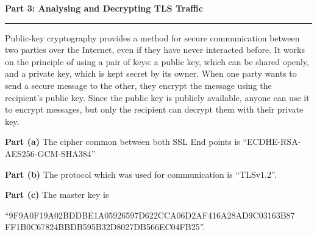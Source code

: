\documentclass[a4paper,12pt]{article}
\newenvironment{solution}[2][]{%
    \begin{mdframed}[linecolor=blue!70!black, linewidth=2pt, roundcorner=10pt, backgroundcolor=yellow!10!white, skipabove=12pt, skipbelow=12pt]%
        \textbf{\large #2}
        \par\noindent\rule{\textwidth}{0.4pt}
}{
    \end{mdframed}
}
\begin{document}
\begin{solution}{Part 3: Analysing and Decrypting TLS Traffic}
    Public-key cryptography provides a method for secure communication between two parties over the Internet, even if they have never interacted before. It works on the principle of using a pair of keys: a public key, which can be shared openly, and a private key, which is kept secret by its owner. When one party wants to send a secure message to the other, they encrypt the message using the recipient's public key. Since the public key is publicly available, anyone can use it to encrypt messages, but only the recipient can decrypt them with their private key.

    \textbf{Part (a)} The cipher common between both SSL End points is ``ECDHE-RSA-AES256-GCM-SHA384''

    \textbf{Part (b)} The protocol which was used for communication is ``TLSv1.2''.

    \textbf{Part (c)} The master key is 
    
    {\small ``9F9A0F19A02BDDBE1A05926597D622CCA06D2AF416A28AD9C03163B87\\FF1B0C67824BBDB595B32D8027DB566EC04FB25''.}
\end{solution}
\end{document}
